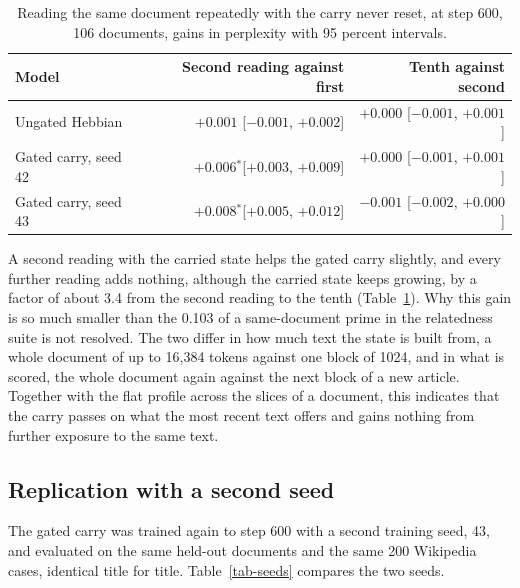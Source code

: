 \documentclass[12pt,a4paper]{report}
\newcommand{\sig}{$^{*}$}
\begin{document}
\begin{table}[H]
  \centering
  \caption{Reading the same document repeatedly with the carry never reset, at step 600, 106 documents, gains in perplexity with 95 percent intervals.}
  \label{tab-repeat}
  \small
  \begin{tabular}{lrr}
    \toprule
    Model & Second reading against first & Tenth against second \\
    \midrule
    Ungated Hebbian & $+0.001$ {\footnotesize [$-0.001$, $+0.002$]} & $+0.000$ {\footnotesize [$-0.001$, $+0.001$]} \\
    Gated carry, seed 42 & $+0.006$\sig {\footnotesize [$+0.003$, $+0.009$]} & $+0.000$ {\footnotesize [$-0.001$, $+0.001$]} \\
    Gated carry, seed 43 & $+0.008$\sig {\footnotesize [$+0.005$, $+0.012$]} & $-0.001$ {\footnotesize [$-0.002$, $+0.000$]} \\
    \bottomrule
  \end{tabular}
\end{table}

A second reading with the carried state helps the gated carry slightly, and every further reading adds nothing, although the carried state keeps growing, by a factor of about 3.4 from the second reading to the tenth (Table~\ref{tab-repeat}). Why this gain is so much smaller than the 0.103 of a same-document prime in the relatedness suite is not resolved. The two differ in how much text the state is built from, a whole document of up to 16{,}384 tokens against one block of 1024, and in what is scored, the whole document again against the next block of a new article. Together with the flat profile across the slices of a document, this indicates that the carry passes on what the most recent text offers and gains nothing from further exposure to the same text.

\subsection{Replication with a second seed}

The gated carry was trained again to step 600 with a second training seed, 43, and evaluated on the same held-out documents and the same 200 Wikipedia cases, identical title for title. Table~\ref{tab-seeds} compares the two seeds.
\end{document}
